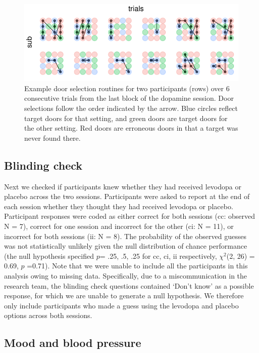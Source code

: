 \documentclass{article}
\begin{document}
\begin{figure}

{\centering \includegraphics[width=0.7\linewidth]{../../images/trajectories2subs} 

}

\caption{Example door selection routines for two participants (rows) over 6 consecutive trials from the last block of the dopamine session. Door selections follow the order indicated by the arrow. Blue circles reflect target doors for that setting, and green doors are target doors for the other setting. Red doors are erroneous doors in that a target was never found there.}\label{fig:trajecfig}
\end{figure}

\hypertarget{blinding-check}{%
\subsection{Blinding check}\label{blinding-check}}

Next we checked if participants knew whether they had received levodopa
or placebo across the two sessions. Participants were asked to report at
the end of each session whether they thought they had received levodopa
or placebo. Participant responses were coded as either correct for both
sessions (cc: observed N = 7), correct for one session and incorrect for
the other (ci: N = 11), or incorrect for both sessions (ii: N = 8). The
probability of the observed guesses was not statistically unlikely given
the null distribution of chance performance (the null hypothesis
specified \(p\)= .25, .5, .25 for cc, ci, ii respectively, \(\chi^2\)(2,
26) = 0.69, \(p\) =0.71). Note that we were unable to include all the
participants in this analysis owing to missing data. Specifically, due
to a miscommunication in the research team, the blinding check questions
contained `Don't know' as a possible response, for which we are unable
to generate a null hypothesis. We therefore only include participants
who made a guess using the levodopa and placebo options across both
sessions.

\hypertarget{mood-and-blood-pressure}{%
\subsection{Mood and blood pressure}\label{mood-and-blood-pressure}}
\end{document}
